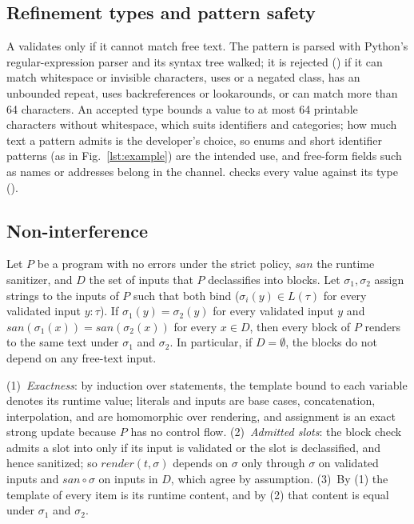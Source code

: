 \documentclass[conference]{IEEEtran}
\begin{document}
\subsection{Refinement types and pattern safety}\label{sec:patterns}
A  validates only if it cannot match free text. The pattern is parsed with Python's regular-expression parser and its syntax tree walked; it is rejected () if it can match whitespace or invisible characters, uses  or a negated class, has an unbounded repeat, uses backreferences or lookarounds, or can match more than 64 characters. An accepted type bounds a value to at most 64 printable characters without whitespace, which suits identifiers and categories; how much text a pattern admits is the developer's choice, so enums and short identifier patterns (as in Fig.~\ref{lst:example}) are the intended use, and free-form fields such as names or addresses belong in the  channel.  checks every value against its type ().

\subsection{Non-interference}
\begin{theorem}\label{thm:ni}
Let $P$ be a program with no errors under the strict policy, $\mathit{san}$ the runtime sanitizer, and $D$ the set of inputs that $P$ declassifies into  blocks. Let $\sigma_1,\sigma_2$ assign strings to the inputs of $P$ such that both bind ($\sigma_i(y)\in L(\tau)$ for every validated input $y{:}\tau$). If $\sigma_1(y)=\sigma_2(y)$ for every validated input $y$ and $\mathit{san}(\sigma_1(x)) = \mathit{san}(\sigma_2(x))$ for every $x\in D$, then every  block of $P$ renders to the same text under $\sigma_1$ and $\sigma_2$. In particular, if $D=\emptyset$, the  blocks do not depend on any free-text input.
\end{theorem}

\begin{IEEEproof}
(1)~\emph{Exactness}: by induction over statements, the template bound to each variable denotes its runtime value; literals and inputs are base cases, concatenation, interpolation,  and  are homomorphic over rendering, and assignment is an exact strong update because $P$ has no control flow. (2)~\emph{Admitted slots}: the block check admits a slot into  only if its input is validated or the slot is declassified, and hence sanitized; so $\mathit{render}(t,\sigma)$ depends on $\sigma$ only through $\sigma$ on validated inputs and $\mathit{san}\circ\sigma$ on inputs in $D$, which agree by assumption. (3)~By (1) the template of every  item is its runtime content, and by (2) that content is equal under $\sigma_1$ and $\sigma_2$.
\end{IEEEproof}
\end{document}
